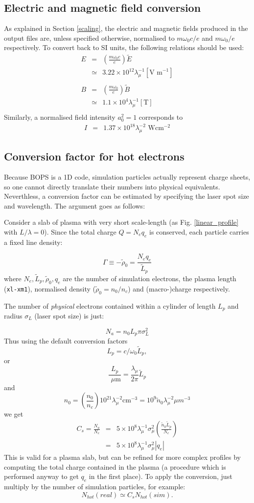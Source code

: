 \documentclass[11pt]{article}
\def\bea{\begin{eqnarray}}
\def\eea{\end{eqnarray}}
\newcommand{\Wcm}{~Wcm$^{-2}$}
\newcommand{\mum}{~$\mu$m}
\begin{document}
\subsection{Electric and magnetic field conversion}
As explained in Section \ref{scaling}, the electric and magnetic fields produced in the output files
are, unless specified otherwise, normalised to
$m\omega_0c/e$ and $m\omega_0/e$ respectively.  To convert back to SI units, the following relations
should be used:
\bea
E &=& \left(\frac{m\omega_0c}{e}\right)\tilde{E} \nonumber \\
  &\simeq & 3.22 \times 10^{12}\lambda_\mu^{-1} [\mbox{V m}^{-1}] \\
& &\\
B &=&  \left(\frac{m\omega_0}{e}\right)\tilde{B} \nonumber \\
 &\simeq & 1.1\times 10^4 \lambda_\mu^{-1} [\mbox{T}] \\
\eea
Similarly, a normalised field intensity $a_0^2=1$ corresponds to 
\bea
I &=& 1.37\times 10^{18} \lambda_\mu^{-2} \mbox{\Wcm} 
\eea
 
\subsection{Conversion factor for hot electrons}
Because BOPS is a 1D code, simulation particles actually represent charge sheets, so one cannot directly
translate their numbers into physical equivalents.  Neverthless, a conversion factor can be estimated
by specifying the laser spot size and wavelength.  The argument goes as follows:

Consider a slab of plasma with very short scale-length (as Fig. \ref{linear_profile} with $L/\lambda=0$).  Since the total charge $Q=N_eq_e$ is conserved, each particle carries a fixed line density:

$$
\Gamma \equiv -\tilde{\rho}_0 = \frac{N_eq_e}{\tilde{L}_p}
$$
where $N_e, \tilde{L}_p, \tilde{\rho}_0, q_e$ are the number of simulation electrons, the plasma length (\texttt{xl-xm1}), normalised density ($\tilde{\rho}_0=n_0/n_c$) and (macro-)charge respectively.  

The number of \emph{physical} electrons contained within a cylinder of length $L_p$ and radius $\sigma_L$ (laser spot size) is just:

$$
N_a = n_0L_p\pi\sigma_L^2
$$
Thus using the default conversion factors
$$L_p = c/\omega_0\tilde{L}_p,$$
 or 
$$\frac{L_p}{\mbox{\mum}} = \frac{\lambda_{\mu}}{2\pi}\tilde{L}_p  
$$
and 
$$
n_0 = \left(\frac{n_0}{n_c}\right)10^{21}\lambda_{\mu}^{-2}\mbox{cm}^{-3} = 10^9\tilde{n}_0\lambda_{\mu}^{-2}\mu m^{-3}$$
we get
\bea
C_s = \frac{N_a}{N_e} &=& 5\times 10^8\lambda_{\mu}^{-1}\sigma_{\mu}^{2}\left(\frac{\tilde{n}_0\tilde{L}_p}{N_e} \right)\nonumber \\
&=& 5\times 10^8\lambda_{\mu}^{-1}\sigma_{\mu}^{2}|q_e|
\eea
This is valid for a plasma slab, but can be refined for more complex profiles by computing the total charge contained in the plasma (a procedure which is performed anyway to get $q_e$ in the first place).
To apply the conversion, just multiply by the number of simulation particles, for example: $$N_{hot}(real) \simeq C_s N_{hot}(sim).$$  
\end{document}
